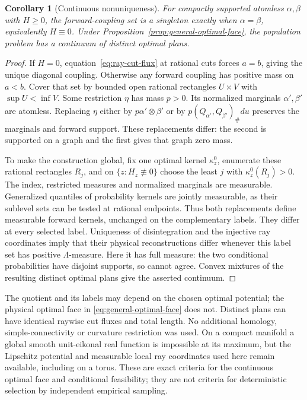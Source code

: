 \documentclass[11pt,reqno]{amsart}
\newtheorem{corollary}[theorem]{Corollary}
\theoremstyle{definition}
\theoremstyle{remark}
\numberwithin{equation}{section}
\begin{document}
\begin{corollary}[Continuous nonuniqueness]
\label{cor:general-continuum-nonunique}
For compactly supported atomless \(\alpha,\beta\) with \(H\ge0\),
the forward-coupling set is a singleton exactly when
\(\alpha=\beta\), equivalently \(H\equiv0\).
Under Proposition~\ref{prop:general-optimal-face}, the population
problem has a continuum of distinct optimal plans.
\end{corollary}
\begin{proof}
If \(H=0\), equation~\eqref{eq:ray-cut-flux} at rational cuts
forces \(a=b\), giving the unique diagonal coupling. Otherwise any
forward coupling has positive mass on \(a<b\). Cover that set by
bounded open rational rectangles \(U\times V\) with
\(\sup U<\inf V\). Some restriction \(\eta\) has mass \(p>0\).
Its normalized marginals \(\alpha',\beta'\) are atomless. Replacing
\(\eta\) either by \(p\alpha'\otimes\beta'\) or by
\(p(Q_{\alpha'},Q_{\beta'})_\#du\) preserves the marginals and
forward support. These replacements differ: the second is supported
on a graph and the first gives that graph zero mass.

To make the construction global, fix one optimal kernel
\(\kappa_z^0\), enumerate these rational rectangles \(R_j\), and
on \(\{z:H_z\not\equiv0\}\) choose the least \(j\) with
\(\kappa_z^0(R_j)>0\). The index, restricted measures and normalized
marginals are measurable. Generalized quantiles of probability kernels
are jointly measurable, as their sublevel sets can be tested at
rational endpoints. Thus both replacements define measurable forward
kernels, unchanged on the complementary labels.
They differ at every selected label. Uniqueness of disintegration and
the injective ray coordinates imply that their physical reconstructions
differ whenever this label set has positive \(\Lambda\)-measure.
Here it has full measure: the two conditional probabilities have
disjoint supports, so cannot agree. Convex mixtures of the resulting
distinct optimal plans give the asserted continuum.
\end{proof}

The quotient and its labels may depend on the chosen optimal potential;
the physical optimal face in \eqref{eq:general-optimal-face} does not.
Distinct plans can have identical raywise cut fluxes and total length.
No additional homology, simple-connectivity or curvature restriction
was used. On a compact manifold a global smooth unit-eikonal real
function is impossible at its maximum, but the Lipschitz potential and
measurable local ray coordinates used here remain available, including
on a torus. These are exact criteria for the continuous optimal face
and conditional feasibility; they are not criteria for deterministic
selection by independent empirical sampling.
\end{document}
